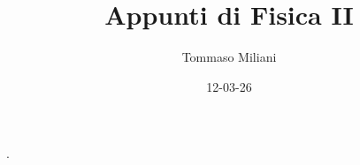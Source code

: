 \documentclass[a4paper, oneside]{article}
\title{Appunti di Fisica II}
\author{Tommaso Miliani}
\date{12-03-26}
\begin{document}
                {}          %
                {}          %
                {\slshape}  %
                {}          %
                {\bfseries} %
                {.}         %
                {\newline}  %
                {}          %
\theoremstyle{theoremEnv}

\newtheorem{definition}{Definizione}[section]
\newtheorem{theorem}{Teorema}[section]
\newtheorem{lemma}{Proposizione}[section]
\newtheorem{observation}{Osservazione}[section]
\newtheorem{corollary}{Corollario}[theorem]
\newtheorem{example}{Esempio}[section]
\newtheorem{remark}{Enunciato}[section]

\maketitle
\end{document}
